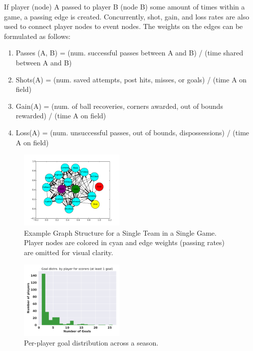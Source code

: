 If player (node) A passed to player B (node B) some amount of times within a game, a passing edge is created. Concurrently, shot, gain, and loss rates are also used to connect player nodes to event nodes. The weights on the edges can be formulated as follows: 

\begin{enumerate}

    \item Passes (A, B) = (num. successful passes between A and B) / (time shared between A and B)

    \item Shots(A) = (num. saved attempts, post hits, misses, or goals) / (time A on field) 

    \item Gain(A) = (num. of ball recoveries, corners awarded, out of bounds rewarded) / (time A on field) 

    \item Loss(A) = (num. unsuccessful passes, out of bounds, dispossessions) / (time A on field) 

\end{enumerate}


\begin{figure}[h]
  \centering
  \includegraphics[width=0.45\textwidth]{plots/soccer_networkx.pdf}
  \caption{Example Graph Structure for a Single Team in a Single Game. Player nodes are colored in cyan and edge weights (passing rates) are omitted for visual clarity.}
    \label{fig:example_graph}
\end{figure}

\begin{figure}[h]
  \centering
  \includegraphics[width=0.45\textwidth]{plots/eplper_player_goal_hist.pdf}
  \caption{Per-player goal distribution across a season.}
    \label{fig:per_player_goal_distro}
\end{figure}


